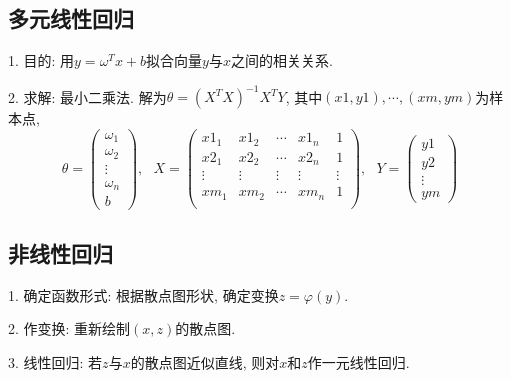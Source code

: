 \subsection{多元线性回归}

1. 目的: 用$y=\omega^Tx+b$拟合向量$y$与$x$之间的相关关系.

2. 求解: 最小二乘法. 解为$\theta=(X^TX)^{-1}X^TY$, 其中$(x1,y1),\cdots,(xm,ym)$为样本点, 
\begin{equation*}
    \theta=\begin{pmatrix}
        \omega_1\\
        \omega_2\\
        \vdots\\
        \omega_n\\
        b
    \end{pmatrix}, ~~~X=\begin{pmatrix}
        x1_1&x1_2&\cdots&x1_n&1\\
        x2_1&x2_2&\cdots&x2_n&1\\
        \vdots&\vdots&\vdots&\vdots&\vdots\\
        xm_1&xm_2&\cdots&xm_n&1\\
    \end{pmatrix},~~~Y=\begin{pmatrix}
        y1\\
        y2\\
        \vdots\\
        ym
    \end{pmatrix}
\end{equation*}

\subsection{非线性回归}

1. 确定函数形式: 根据散点图形状, 确定变换$z=\varphi(y)$.

2. 作变换: 重新绘制$(x,z)$的散点图.

3. 线性回归: 若$z$与$x$的散点图近似直线, 则对$x$和$z$作一元线性回归.
